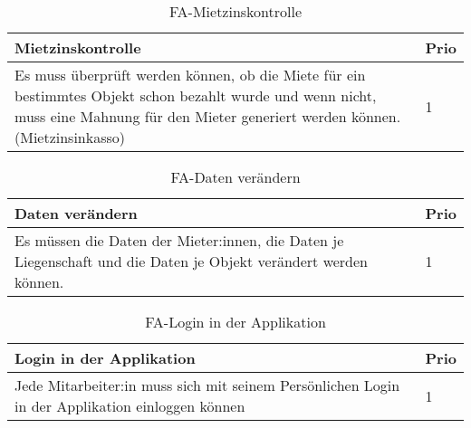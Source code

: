 \begin{table}[H]
  \centering
  \settowidth{}
  \setlength\extrarowheight{2pt}
  \begin{tabulary}{1.0\textwidth}{|m{16cm}|L|}
    \hline
    \textbf{Mietzinskontrolle}&\textbf{Prio}\\
    \hline
    Es muss überprüft werden können, ob die Miete für ein bestimmtes Objekt schon bezahlt wurde und wenn nicht, muss eine Mahnung für den Mieter generiert werden können. (Mietzinsinkasso) & 1\\
    \hline
  \end{tabulary}
  \caption{FA-Mietzinskontrolle}
  \label{faMietzinskontrolle}
\end{table}

\begin{table}[H]
  \centering
  \settowidth{}
  \setlength\extrarowheight{2pt}
  \begin{tabulary}{1.0\textwidth}{|m{16cm}|L|}
    \hline
    \textbf{Daten verändern}&\textbf{Prio}\\
    \hline
    Es müssen die Daten der Mieter:innen, die Daten je Liegenschaft und die Daten je Objekt verändert werden können. & 1\\
    \hline
  \end{tabulary}
  \caption{FA-Daten verändern}
  \label{faDatenVeraendern}
\end{table}

\begin{table}[H]
  \centering
  \settowidth{}
  \setlength\extrarowheight{2pt}
  \begin{tabulary}{1.0\textwidth}{|m{16cm}|L|}
    \hline
    \textbf{Login in der Applikation}&\textbf{Prio}\\
    \hline
    Jede Mitarbeiter:in muss sich mit seinem Persönlichen Login in der Applikation einloggen können & 1\\
    \hline
  \end{tabulary}
  \caption{FA-Login in der Applikation}
  \label{faLogininderApplikatio}
\end{table}